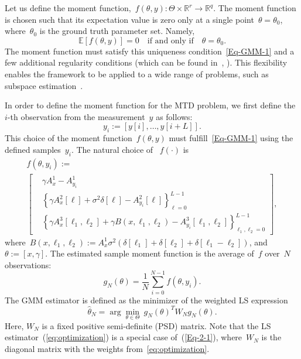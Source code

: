 \documentclass{article}
\newcommand{\E}[0]{\mathbb{E}}
\newcommand{\R}[0]{\mathbb{R}}
\begin{document}
Let us define the moment function,~\mbox{$f(\theta, y)\colon \Theta \times \R^r \to \R^q$}. The moment function is chosen such that its expectation value is zero only at a single point~$\theta=\theta_0$, where~$\theta_0$ is the ground truth parameter set. Namely,
\begin{equation}\label{Eq-GMM-1}
	\E\left[f(\theta,y)\right] = 0 \quad \text{if and only if} \quad \theta = \theta_0.
\end{equation}
The moment function must satisfy this uniqueness condition~\eqref{Eq-GMM-1} and a few additional regularity conditions (which can be found in~\cite{Hansen1982}, \cite{Hall2005} \cite{abas2021generalized}). This flexibility enables the framework to be applied to a wide range of problems, such as subspace estimation~\cite{fan2018optimal}.

In order to define the moment function for the MTD problem, we first define the $i$-th observation from the measurement~$y$ as follows:
\begin{equation}
	y_i := [y[i],\ldots, y[i+L]].
\end{equation}
This choice of the moment function~$f(\theta, y)$ must fulfill~\eqref{Eq-GMM-1} using the defined samples~$y_i$. The natural choice of ~$f(\cdot)$ is
\begin{multline} \label{Eq-GMM-2}
	f(\theta, y_i) := \\
	\begin{bmatrix}
		&\gamma A_x^1 - A_{y_i}^1\\
		&\left\{\gamma A_x^2[\ell] + \sigma^2 \delta[\ell] - A_{y_i}^2 [\ell]\right\}_{\ell  =0}^{L-1} \\
		&\left\{\gamma A_x^3[\ell_1, \ell_2] + \gamma B(x, \ell_1, \ell_2) - A_{y_i}^3[\ell_1, \ell_2]\right\}_{\ell_1, \ell_2 = 0}^{L-1}
	\end{bmatrix},
\end{multline}
where~$B(x, \ell_1, \ell_2) := A_{x}^1 \sigma^2 (\delta[\ell_1] + \delta[\ell_2] + \delta[\ell_1 - \ell_2])$, and~\mbox{$\theta := [x, \gamma]$}. The estimated sample moment function is the average of~$f$ over~$N$ observations:
\begin{equation}\label{Eq-2-5}
	g_N(\theta) = \frac{1}{N} \sum_{i = 0}^{N - 1} f(\theta, y_i).
\end{equation}
The GMM estimator is defined as the minimizer of the weighted LS expression
\begin{equation} \label{Eq-2-1}
	\hat{\theta}_N = \arg\min_{\theta \in \Theta} \ g_N(\theta)^T W_N g_N(\theta).
\end{equation}
Here, $W_N$ is a fixed positive semi-definite (PSD) matrix. Note that the LS estimator~(\ref{eq:optimization}) is a special case of~(\ref{Eq-2-1}), where~$W_N$ is the diagonal matrix with the weights from~\eqref{eq:optimization}.
\end{document}
